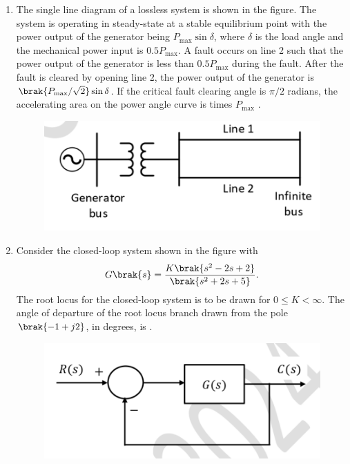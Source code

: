 \documentclass[journal,12pt,onecolumn]{IEEEtran}
\theoremstyle{remark}
\begin{document}
\begin{enumerate}[start=1, label=Q.\arabic*]
    \hfill{}

    \item The single line diagram of a lossless system is shown in the figure. The system is operating in steady-state at a stable equilibrium point with the power output of the generator being $P_{\max}\sin\delta$, where $\delta$ is the load angle and the mechanical power input is $0.5 P_{\max}$. A fault occurs on line 2 such that the power output of the generator is less than $0.5 P_{\max}$ during the fault. After the fault is cleared by opening line 2, the power output of the generator is $\brak{P_{\max}/\sqrt{2}}\sin\delta$. If the critical fault clearing angle is $\pi/2$ radians, the accelerating area on the power angle curve is \underline{\hspace{2cm}} times $P_{\max}$ .
    \begin{figure}[H]
        \includegraphics[width=0.6\columnwidth]{Figures/q56.png}
        \centering
        \caption{}
    \end{figure}

    \hfill{}

    \item Consider the closed-loop system shown in the figure with
    \begin{align*}
        G\brak{s} = \frac{K\brak{s^2 - 2s + 2}}{\brak{s^2 + 2s + 5}}.
    \end{align*}
    The root locus for the closed-loop system is to be drawn for $0 \le K < \infty$. The angle of departure  of the root locus branch drawn from the pole $\brak{-1+j2}$, in degrees, is \underline{\hspace{2cm}} .
    \begin{figure}[H]
        \includegraphics[width=0.6\columnwidth]{Figures/q57.png}
        \centering
        \caption{}
    \end{figure}


\end{enumerate}
\end{document}
